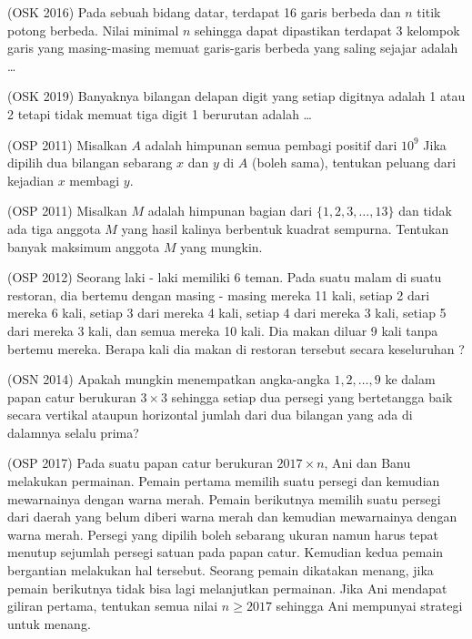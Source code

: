 \documentclass[11pt]{scrartcl}
\begin{document}
	\begin{soalbaru}
	(OSK 2016) Pada sebuah bidang datar, terdapat 16 garis berbeda dan $n$ titik potong berbeda. Nilai
minimal $n$ sehingga dapat dipastikan terdapat 3 kelompok garis yang masing-masing memuat
garis-garis berbeda yang saling sejajar adalah \dots
	\end{soalbaru}
	
	\begin{soalbaru} (OSK 2019)
	Banyaknya bilangan delapan digit yang setiap digitnya adalah 1 atau 2 tetapi tidak
memuat tiga digit 1 berurutan adalah \dots
	\end{soalbaru}
	
	\begin{soalbaru}
	(OSP 2011) Misalkan $A$ adalah himpunan semua pembagi positif dari $10^9$ Jika dipilih dua bilangan sebarang $x$ dan $y$ di $A$ (boleh sama), tentukan peluang dari kejadian $x$
	membagi $y$.
	\end{soalbaru} 
	
	\begin{soalbaru}
	 (OSP 2011) Misalkan $M$ adalah himpunan bagian dari $\{1,2,3,\dots,13\}$ dan tidak ada tiga	anggota $M$ yang hasil kalinya berbentuk kuadrat sempurna. Tentukan banyak maksimum anggota $M$ yang mungkin.
	\end{soalbaru}
	
	\begin{soalbaru}
	(OSP 2012) Seorang laki - laki memiliki 6 teman. Pada suatu malam di suatu restoran, dia bertemu
	dengan masing - masing mereka 11 kali, setiap 2 dari mereka 6 kali, setiap 3 dari mereka 4 kali,
	setiap 4 dari mereka 3 kali, setiap 5 dari mereka 3 kali, dan semua mereka 10 kali. Dia makan diluar
	9 kali tanpa bertemu mereka. Berapa kali dia makan di restoran tersebut secara keseluruhan ?
	\end{soalbaru} 
	
	\begin{soalbaru}
	(OSN 2014) Apakah mungkin menempatkan angka-angka $1,2,\dots,9$ ke dalam papan catur berukuran $3\times 3$ sehingga setiap dua persegi yang bertetangga baik secara vertikal ataupun horizontal jumlah dari dua bilangan yang
	ada di dalamnya selalu prima?
	\end{soalbaru} 
	
	\begin{soalbaru}
	(OSP 2017) Pada suatu papan catur berukuran $2017 \times n$, Ani dan Banu melakukan permainan. Pemain
	pertama memilih suatu persegi dan kemudian mewarnainya dengan warna merah. Pemain
	berikutnya memilih suatu persegi dari daerah yang belum diberi warna merah dan kemudian
	mewarnainya dengan warna merah. Persegi yang dipilih boleh sebarang ukuran namun harus
	tepat menutup sejumlah persegi satuan pada papan catur. Kemudian kedua pemain bergantian
	melakukan hal tersebut. Seorang pemain dikatakan menang, jika pemain berikutnya tidak
	bisa lagi melanjutkan permainan. Jika Ani mendapat giliran pertama, tentukan semua nilai
	$n \ge 2017$ sehingga Ani mempunyai strategi untuk menang.
	\end{soalbaru} 
	
\end{document}
